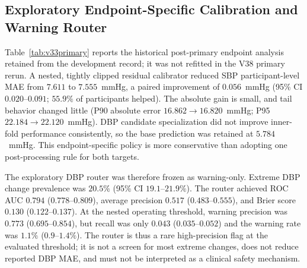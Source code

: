 \documentclass[12pt]{article}
\begin{document}
\subsection{Exploratory Endpoint-Specific Calibration and Warning Router}
\label{sec:v34}
Table~\ref{tab:v33primary} reports the historical post-primary endpoint analysis retained from the development record; it was not refitted in the V38 primary rerun. A nested, tightly clipped residual calibrator reduced SBP participant-level MAE from $7.611$ to $7.555$~mmHg, a paired improvement of $0.056$~mmHg (95\% CI $0.020$--$0.091$; $55.9\%$ of participants helped). The absolute gain is small, and tail behavior changed little (P90 absolute error $16.862 \to 16.820$~mmHg; P95 $22.184 \to 22.120$~mmHg). DBP candidate specialization did not improve inner-fold performance consistently, so the base prediction was retained at $5.784$~mmHg. This endpoint-specific policy is more conservative than adopting one post-processing rule for both targets.
\begin{table}[t]
\centering
\caption{Exploratory Endpoint-Specific Nested Analysis (653 Participants)}
\label{tab:v33primary}
\scriptsize
{}
\end{table}
The exploratory DBP router was therefore frozen as warning-only. Extreme DBP change prevalence was $20.5\%$ (95\% CI $19.1$--$21.9\%$). The router achieved ROC AUC $0.794$ ($0.778$--$0.809$), average precision $0.517$ ($0.483$--$0.555$), and Brier score $0.130$ ($0.122$--$0.137$). At the nested operating threshold, warning precision was $0.773$ ($0.695$--$0.854$), but recall was only $0.043$ ($0.035$--$0.052$) and the warning rate was $1.1\%$ ($0.9$--$1.4\%$). The router is thus a rare high-precision flag at the evaluated threshold; it is not a screen for most extreme changes, does not reduce reported DBP MAE, and must not be interpreted as a clinical safety mechanism.
\end{document}
